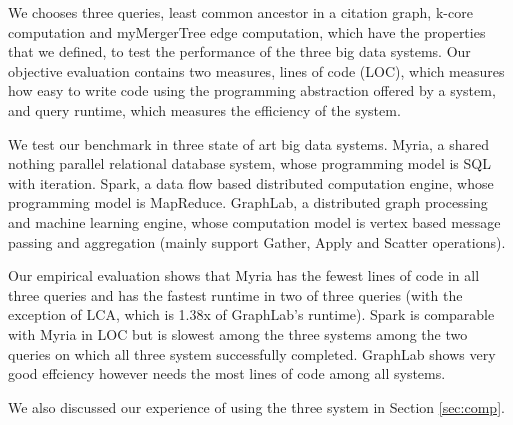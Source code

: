We chooses three queries, least common ancestor in a citation graph, k-core
computation and myMergerTree edge computation, which have the properties that
we defined, to test the performance of the three big data systems. Our
objective evaluation contains two measures, lines of code (LOC), which 
measures how easy to write code using the programming abstraction offered by
a system, and query runtime, which measures the efficiency of the system.

We test our benchmark in three state of art big data systems. Myria, a shared
nothing parallel relational database system, whose programming model is SQL 
with iteration. Spark, a data flow based distributed computation engine, whose
 programming model is MapReduce. GraphLab, a distributed graph processing and 
machine learning engine, whose computation model is vertex based message
passing and aggregation (mainly support Gather, Apply and Scatter operations).

Our empirical evaluation shows that Myria has the fewest lines of code in all
three queries and has the fastest runtime in two of three queries (with the 
exception of LCA, which is 1.38x of GraphLab's runtime). Spark is comparable 
with Myria in LOC but is slowest among the three systems among the two queries
on which all three system successfully completed. GraphLab shows very good 
effciency however needs the most lines of code among all systems.

We also discussed our experience of using the three system in Section \ref{sec:comp}.

